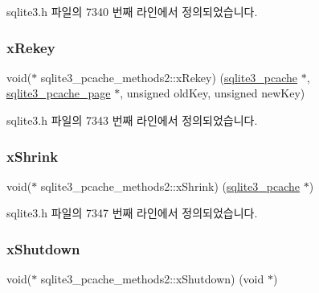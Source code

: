 sqlite3.\+h 파일의 7340 번째 라인에서 정의되었습니다.

\mbox{\label{structsqlite3__pcache__methods2_ad5b7609bdc0d2ae80325f7925b76c0af}} 
\subsubsection{\texorpdfstring{x\+Rekey}{xRekey}}
{\footnotesize\ttfamily void($\ast$ sqlite3\+\_\+pcache\+\_\+methods2\+::x\+Rekey) (\hyperlink{sqlite3_8h_a096c453d937d51f7926d7d31c8e0bd2f}{sqlite3\+\_\+pcache} $\ast$, \hyperlink{structsqlite3__pcache__page}{sqlite3\+\_\+pcache\+\_\+page} $\ast$, unsigned old\+Key, unsigned new\+Key)}



sqlite3.\+h 파일의 7343 번째 라인에서 정의되었습니다.

\mbox{\label{structsqlite3__pcache__methods2_a225971a193ff429d9f1339aca39c7755}} 
\subsubsection{\texorpdfstring{x\+Shrink}{xShrink}}
{\footnotesize\ttfamily void($\ast$ sqlite3\+\_\+pcache\+\_\+methods2\+::x\+Shrink) (\hyperlink{sqlite3_8h_a096c453d937d51f7926d7d31c8e0bd2f}{sqlite3\+\_\+pcache} $\ast$)}



sqlite3.\+h 파일의 7347 번째 라인에서 정의되었습니다.

\mbox{\label{structsqlite3__pcache__methods2_a4285fc03adf01cbd3283644a1072ffef}} 
\subsubsection{\texorpdfstring{x\+Shutdown}{xShutdown}}
{\footnotesize\ttfamily void($\ast$ sqlite3\+\_\+pcache\+\_\+methods2\+::x\+Shutdown) (void $\ast$)}




